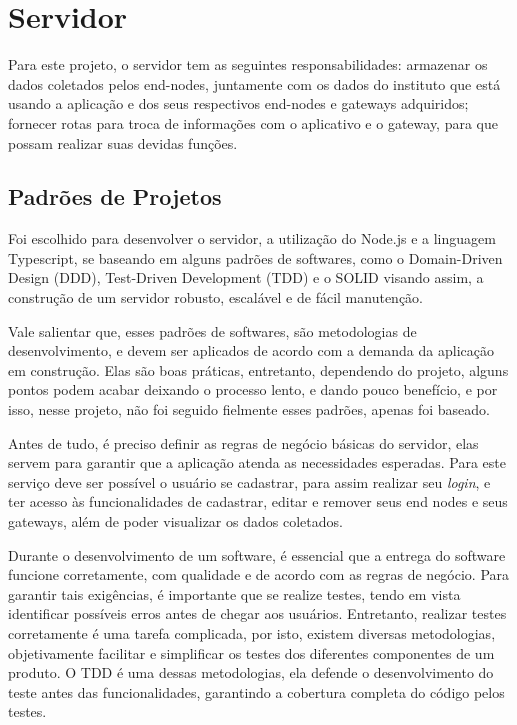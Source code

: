 \section{Servidor}
\label{metod:servidor}
Para este projeto, o servidor tem as seguintes responsabilidades: armazenar os dados coletados pelos end-nodes, juntamente com os dados do instituto que está usando a aplicação e dos seus respectivos end-nodes e gateways adquiridos; fornecer rotas para troca de informações com o aplicativo e o gateway, para que possam realizar suas devidas funções.

\subsection{Padrões de Projetos}
\label{metod:servidor:padroes}
Foi escolhido para desenvolver o servidor, a utilização do Node.js e a linguagem Typescript, se baseando em alguns padrões de softwares, como o Domain-Driven Design (DDD), Test-Driven Development (TDD) e o SOLID visando assim, a construção de um servidor robusto, escalável e de fácil manutenção.

Vale salientar que, esses padrões de softwares, são metodologias de desenvolvimento, e devem ser aplicados de acordo com a demanda da aplicação em construção. Elas são boas práticas, entretanto, dependendo do projeto, alguns pontos podem acabar deixando o processo lento, e dando pouco benefício, e por isso, nesse projeto, não foi seguido fielmente esses padrões, apenas foi baseado.

Antes de tudo, é preciso definir as regras de negócio básicas do servidor, elas servem para garantir que a aplicação atenda as necessidades esperadas. Para este serviço deve ser possível o usuário se cadastrar, para assim realizar seu \textit{login}, e ter acesso às funcionalidades de cadastrar, editar e remover seus end nodes e seus gateways, além de poder visualizar os dados coletados.

Durante o desenvolvimento de um software, é essencial que a entrega do software funcione corretamente, com qualidade e de acordo com as regras de negócio. Para garantir tais exigências, é importante que se realize testes, tendo em vista identificar possíveis erros antes de chegar aos usuários. Entretanto, realizar testes corretamente é uma tarefa complicada, por isto, existem diversas metodologias, objetivamente facilitar e simplificar os testes dos diferentes componentes de um produto. O TDD é uma dessas metodologias, ela defende o desenvolvimento do teste antes das funcionalidades, garantindo a cobertura completa do código pelos testes.

